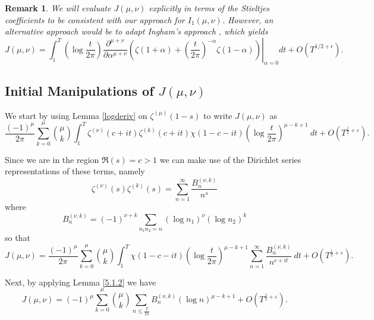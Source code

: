 \documentclass[12pt, a4paper,reqno]{amsart}
\newtheorem*{remark*}{Remark}
\theoremstyle{definition}
\numberwithin{equation}{section}
\begin{document}
\begin{remark*}
    We will evaluate $J(\mu,\nu)$ explicitly in terms of the Stieltjes coefficients to be consistent with our approach for $I_1(\mu,\nu)$. However, an alternative approach would be to adapt Ingham's approach \cite{Ing26}, which yields
    \begin{equation*}
    J(\mu,\nu) = \int_1^T \left(\log \frac{t}{2\pi} \right) \left. \frac{\partial^{\mu+\nu}}{\partial \alpha^{\mu+\nu}} \left( \zeta(1+\alpha) + \left(\frac{t}{2\pi}\right)^{-\alpha} \zeta(1-\alpha) \right) \right|_{\alpha=0}   dt  + O\left(T^{1/2+\epsilon}\right) .
    \end{equation*}
\end{remark*}

\subsection{Initial Manipulations of $J(\mu,\nu)$} \hfill

We start by using Lemma \ref{logderiv} on $\zeta^{(\mu)}(1-s)$ to write $J(\mu,\nu)$ as 
\begin{equation*}
   \frac{(-1)^{\mu}}{2\pi}\sum_{k=0}^{\mu}  \binom{\mu}{k}  \int_1^T\zeta^{(\nu)}(c+it)\zeta^{(k)}(c+it)\chi(1-c-it)\left(\log\frac{t}{2\pi}\right)^{\mu-k+1}\ dt+O\left(T^{\frac{1}{2}+\varepsilon}\right).
\end{equation*}

Since we are in the region $\Re(s)=c>1$ we can make use of the Dirichlet series representations of these terms, namely
\begin{equation*}
    \zeta^{(\nu)}(s)\zeta^{(k)}(s)=\sum_{n=1}^{\infty}\frac{B_n^{(\nu,k)}}{n^s}
\end{equation*}
where 
\begin{equation*}
    B_n^{(\nu,k)}=(-1)^{\nu+k}\sum_{n_1n_2=n}(\log n_1)^{\nu}(\log n_2)^{k}
\end{equation*}
so that
\begin{equation*}
    J(\mu,\nu)=\frac{(-1)^{\mu}}{2\pi}\sum_{k=0}^{\mu} \binom{\mu}{k}  \int_1^T\chi(1-c-it)\left(\log\frac{t}{2\pi}\right)^{\mu-k+1}\sum_{n=1}^{\infty}\frac{B_n^{(\nu,k)}}{n^{c+it}} \ dt +O\left(T^{\frac{1}{2}+\varepsilon}\right).
\end{equation*}

Next, by applying Lemma \ref{5.1.2} we have 
\begin{equation} \label{eq:JInTermsOfB}
    J(\mu,\nu)=(-1)^{\mu}\sum_{k=0}^{\mu} \binom{\mu}{k} \sum_{n\le\frac{T}{2\pi}}B_n^{(\nu,k)}(\log n)^{\mu-k+1}+O\left(T^{\frac{1}{2}+\varepsilon}\right).
\end{equation}
\end{document}
